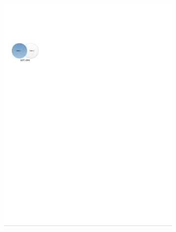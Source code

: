 \begin{figure}[H]
\centering
  \begin{subfigure}[c]{0.3\textwidth}\centering
  \includegraphics[width=\textwidth]{figures/sql/left_join.pdf}
  \label{fig:sql:joins:left_join}
  \end{subfigure}
  ~
  \begin{subfigure}[c]{0.3\textwidth}\centering

\end{subfigure}
\end{figure}
